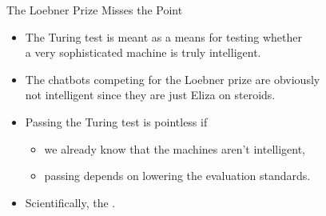 \documentclass[xcolor={usenames,svgnames,x11names,dvipsnames,table}]{beamer}
\begin{document}
\begin{frame}{The Loebner Prize Misses the Point}
    \begin{itemize}
        \item The Turing test is meant as a means for testing whether\\
            a very sophisticated machine is truly intelligent.
        \item The chatbots competing for the Loebner prize are obviously\\
            not intelligent since they are just Eliza on steroids.
        \item Passing the Turing test is pointless if
            \begin{itemize}
                \item we already know that the machines aren't intelligent,
                \item passing depends on lowering the evaluation standards. 
            \end{itemize}
        \item Scientifically, the .
    \end{itemize}
\end{frame}
\end{document}
